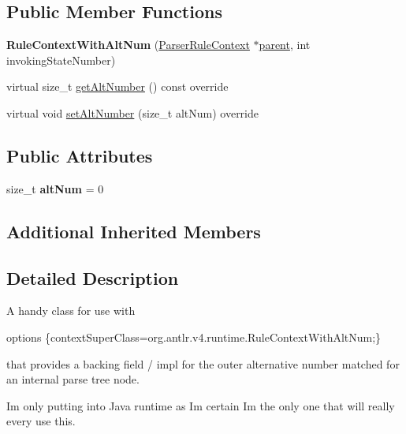 \subsection*{Public Member Functions}
\begin{DoxyCompactItemize}
\item 
\mbox{\label{classantlr4_1_1RuleContextWithAltNum_a80ef315e4101e50fe9dde049ef898c5e}} 
{\bfseries Rule\+Context\+With\+Alt\+Num} (\hyperlink{classantlr4_1_1ParserRuleContext}{Parser\+Rule\+Context} $\ast$\hyperlink{classantlr4_1_1tree_1_1ParseTree_a83402632670316b68280c04e6be70d50}{parent}, int invoking\+State\+Number)
\item 
virtual size\+\_\+t \hyperlink{classantlr4_1_1RuleContextWithAltNum_a6efffe072fe42ba82c405545db4e5510}{get\+Alt\+Number} () const override
\item 
virtual void \hyperlink{classantlr4_1_1RuleContextWithAltNum_adf2d601a196a88f4f399ea5847f44151}{set\+Alt\+Number} (size\+\_\+t alt\+Num) override
\end{DoxyCompactItemize}
\subsection*{Public Attributes}
\begin{DoxyCompactItemize}
\item 
\mbox{\label{classantlr4_1_1RuleContextWithAltNum_a5c4d523112f922485889042cf5efc9a4}} 
size\+\_\+t {\bfseries alt\+Num} = 0
\end{DoxyCompactItemize}
\subsection*{Additional Inherited Members}


\subsection{Detailed Description}
A handy class for use with

options \{context\+Super\+Class=org.\+antlr.\+v4.\+runtime.\+Rule\+Context\+With\+Alt\+Num;\}

that provides a backing field / impl for the outer alternative number matched for an internal parse tree node.

I\textquotesingle{}m only putting into Java runtime as I\textquotesingle{}m certain I\textquotesingle{}m the only one that will really every use this. 

